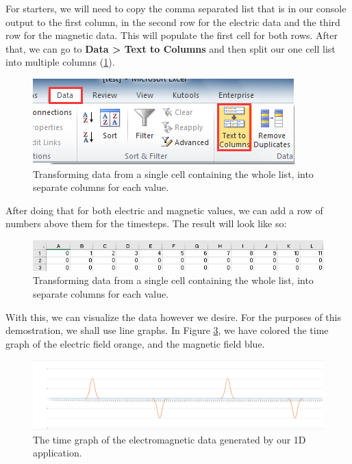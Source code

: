 For starters, we will need to copy the comma separated list that is in our console output to the first column, in the second row for the electric data and the third row for the magnetic data. This will populate the first cell for both rows. After that, we can go to \textbf{Data > Text to Columns} and then split our one cell list into multiple columns (\ref{fig:fdtd1dexcel1}).

\begin{figure}[h!]
	\centering
	\includegraphics{Figures/fdtd1dexcel1}
	\decoRule
	\caption[1D Excel - Text to Columns]{Transforming data from a single cell containing the whole list, into separate columns for each value.}
	\label{fig:fdtd1dexcel1}
\end{figure}

After doing that for both electric and magnetic values, we can add a row of numbers above them for the timesteps. The result will look like so:

\begin{figure}[h!]
	\centering
	\includegraphics{Figures/fdtd1dexcel2}
	\decoRule
	\caption[1D Excel - Text to Columns]{Transforming data from a single cell containing the whole list, into separate columns for each value.}
	\label{fig:fdtd1dexcel2}
\end{figure}

With this, we can visualize the data however we desire. For the purposes of this demostration, we shall use line graphs. In Figure \ref{fig:emTimeGraph}, we have colored the time graph of the electric field orange, and the magnetic field blue.

\begin{figure}[h!]
	\centering
	\includegraphics[scale=0.33]{Figures/1DtimeGraph}
	\decoRule
	\caption[1D Electromagnetic Time Graph]{The time graph of the electromagnetic data generated by our 1D application.}
	\label{fig:emTimeGraph}
\end{figure}

